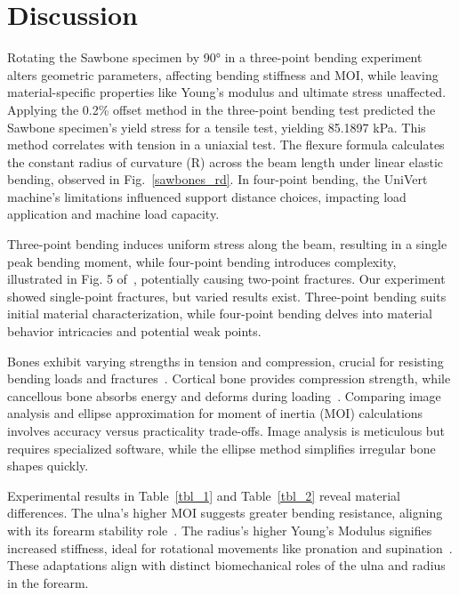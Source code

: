 \documentclass[conference, letterpaper]{IEEEtran}
\begin{document}
\section{Discussion}
    Rotating the Sawbone specimen by 90° in a three-point bending experiment alters geometric parameters, affecting bending stiffness and MOI, while leaving material-specific properties like Young's modulus and ultimate stress unaffected. Applying the 0.2\% offset method in the three-point bending test predicted the Sawbone specimen's yield stress for a tensile test, yielding 85.1897 kPa. This method correlates with tension in a uniaxial test. The flexure formula calculates the constant radius of curvature (R) across the beam length under linear elastic bending, observed in Fig.~\ref{sawbones_rd}. In four-point bending, the UniVert machine's limitations influenced support distance choices, impacting load application and machine load capacity.

    Three-point bending induces uniform stress along the beam, resulting in a single peak bending moment, while four-point bending introduces complexity, illustrated in Fig. 5 of~\cite{Xue2017}, potentially causing two-point fractures. Our experiment showed single-point fractures, but varied results exist. Three-point bending suits initial material characterization, while four-point bending delves into material behavior intricacies and potential weak points.

    Bones exhibit varying strengths in tension and compression, crucial for resisting bending loads and fractures~\cite{Takata2011}. Cortical bone provides compression strength, while cancellous bone absorbs energy and deforms during loading~\cite{Dai2022}. Comparing image analysis and ellipse approximation for moment of inertia (MOI) calculations involves accuracy versus practicality trade-offs. Image analysis is meticulous but requires specialized software, while the ellipse method simplifies irregular bone shapes quickly.

    Experimental results in Table~\ref{tbl_1} and Table~\ref{tbl_2} reveal material differences. The ulna's higher MOI suggests greater bending resistance, aligning with its forearm stability role~\cite{Lu2012}. The radius's higher Young's Modulus signifies increased stiffness, ideal for rotational movements like pronation and supination~\cite{Shaaban2006}. These adaptations align with distinct biomechanical roles of the ulna and radius in the forearm.



\end{document}
